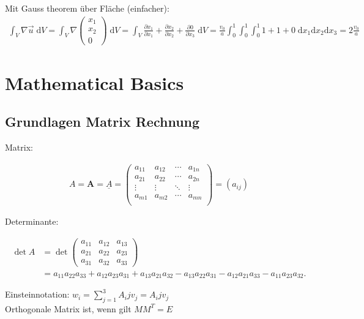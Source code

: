 \documentclass[a4paper]{scrartcl}
\begin{document}
Mit Gauss theorem über Fläche (einfacher):
\begin{align}
\int_V \nabla \vec u \; \mathrm dV = \int_V \nabla \begin{pmatrix}
x_1\\ x_2\\ 0
\end{pmatrix} \; \mathrm dV = \int_{V}
\frac{\partial x_1}{\partial x_1} + \frac{\partial x_2}{\partial x_2} +
\frac{\partial 0}{\partial x_3} \; \mathrm dV =
\frac{v_0}{a}
\int_{0}^{1}
\int_{0}^{1}
\int_{0}^{1} 1 + 1 + 0 \; \mathrm dx_1 \mathrm dx_2 \mathrm dx_3 = 2
\frac{v_0}{a}
\end{align}

\section{Mathematical Basics}
\subsection{Grundlagen Matrix Rechnung}

Matrix:

\begin{align}
A=\mathbf{A}=\underline{A}=\begin{pmatrix} a_{11} & a_{12} & \cdots & a_{1n}\\
a_{21} & a_{22} & \cdots & a_{2n}\\ \vdots & \vdots & \ddots & \vdots\\ a_{m1}
& a_{m2} & \cdots & a_{mn}\\ \end{pmatrix} = (a_{ij})
\end{align}

Determinante:

\begin{align} \det A &= \det \begin{pmatrix} a_{11} & a_{12} & a_{13} \\ a_{21}
& a_{22} & a_{23} \\ a_{31} & a_{32} & a_{33} \end{pmatrix} \\ &= a_{11} a_{22}
a_{33} +a_{12} a_{23} a_{31} + a_{13} a_{21} a_{32} - a_{13} a_{22} a_{31} -
a_{12} a_{21} a_{33} - a_{11} a_{23} a_{32}. \end{align}


Einsteinnotation: $w_i=\sum_{j=1}^{3}A_ijv_j=A_ijv_j$
\\
Orthogonale Matrix ist, wenn gilt $MM^T=E$
\\
\end{document}
